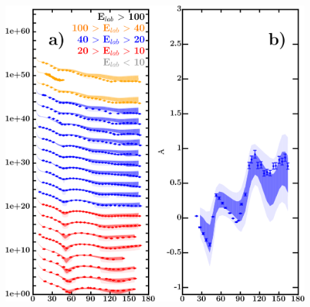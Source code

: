 \documentclass[twocolumn,secnumarabic,amssymb, nobibnotes, aps, prl,
superscriptaddress, nobalancelastpage, draft]{revtex4}
\begin{document}
\begin{figure}[!htb]
    \centering
    \begin{minipage}{0.4\linewidth}
        \centering
        \includegraphics[width=\linewidth]{figures/o18_protonElastic.png}
        \label{DOM_o18_proton_elastic}
    \end{minipage}\hspace{6pt}
    \begin{minipage}{0.4\linewidth}
        \centering
        \vspace{-10pt}
        \begin{minipage}[c]{0.5\linewidth}
            \centering

\end{minipage}
\end{minipage}
\end{figure}
\end{document}
